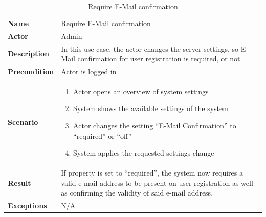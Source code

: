 \begin{table}[ht]
    \caption{Require E-Mail confirmation }
    \begin{tabular}{|L{5cm}|L{10cm}|}
        \toprule
        \textbf{Name}         & Require E-Mail confirmation \\
        \textbf{Actor}        & Admin                       \\
        \textbf{Description} & In this use case, the actor changes the server settings, so E-Mail confirmation for user
        registration is required, or not. \\
        \textbf{Precondition} & Actor is logged in          \\
        \textbf{Scenario} &
        \vspace{-0.75cm}
        \begin{enumerate}
            \setlength\itemsep{-0.5em}
            \item Actor opens an overview of system settings
            \item System shows the available settings of the system
            \item Actor changes the setting \enquote{E-Mail Confirmation} to \enquote{required} or \enquote{off}
            \item  System applies the requested settings change
        \end{enumerate} \\[-0.5cm]
        \textbf{Result} & If property is set to \enquote{required}, the system now requires a valid e-mail address to be
        present on user registration as well as confirming the validity of said e-mail address. \\
        \textbf{Exceptions}   & N/A                         \\
        \bottomrule
    \end{tabular}
    \label{tab:table35}
\end{table}

